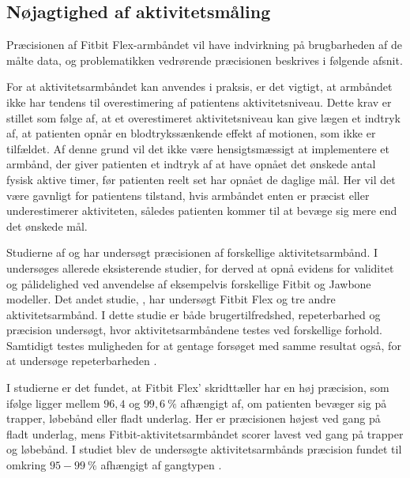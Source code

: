 \subsection{Nøjagtighed af aktivitetsmåling} \label{noejagtighed}

Præcisionen af Fitbit Flex-armbåndet vil have indvirkning på brugbarheden af de målte data, og problematikken vedrørende præcisionen beskrives i følgende afsnit. 

For at aktivitetsarmbåndet kan anvendes i praksis, er det vigtigt, at armbåndet ikke har tendens til overestimering af patientens aktivitetsniveau. Dette krav er stillet som følge af, at et overestimeret aktivitetsniveau kan give lægen et indtryk af, at patienten opnår en blodtrykssænkende effekt af motionen, som ikke er tilfældet. Af denne grund vil det ikke være hensigtsmæssigt at implementere et armbånd, der giver patienten et indtryk af at have opnået det ønskede antal fysisk aktive timer, før patienten reelt set har opnået de daglige mål. Her vil det være gavnligt for patientens tilstand, hvis armbåndet enten er præcist eller underestimerer aktiviteten, således patienten kommer til at bevæge sig mere end det ønskede mål.

Studierne af \citeauthor{evenson2015} og \citeauthor{kaewkannate2016} har undersøgt præcisionen af forskellige aktivitetsarmbånd. I \citeauthor{evenson2015} undersøges allerede eksisterende studier, for derved at opnå evidens for validitet og pålidelighed ved anvendelse af eksempelvis forskellige Fitbit og Jawbone modeller. Det andet studie, \citeauthor{kaewkannate2016}, har undersøgt Fitbit Flex og tre andre aktivitetsarmbånd. I dette studie er både brugertilfredshed, repeterbarhed og præcision undersøgt, hvor aktivitetsarmbåndene testes ved forskellige forhold. Samtidigt testes muligheden for at gentage forsøget med samme resultat også, for at undersøge repeterbarheden \citep{evenson2015, kaewkannate2016}.

I studierne er det fundet, at Fitbit Flex' skridttæller har en høj præcision, som ifølge \citeauthor{kaewkannate2016} ligger mellem $96,4$ og $99,6~\%$ afhængigt af, om patienten bevæger sig på trapper, løbebånd eller fladt underlag. Her er præcisionen højest ved gang på fladt underlag, mens Fitbit-aktivitetsarmbåndet scorer lavest ved gang på trapper og løbebånd. I studiet blev de undersøgte aktivitetsarmbånds præcision fundet til omkring $95-99~\%$ afhængigt af gangtypen \citep{kaewkannate2016}.

